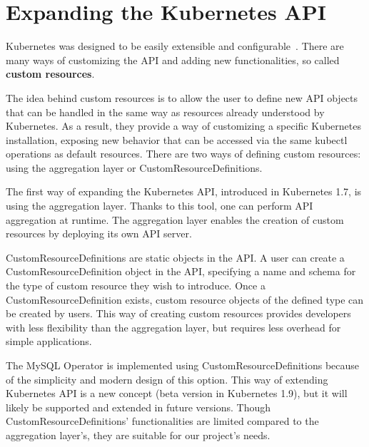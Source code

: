 \section{Expanding the Kubernetes API}
Kubernetes was designed to be easily extensible and configurable~\cite{extending-kubeapi}. There are
many ways of customizing the API and adding new functionalities, so called \textbf{custom resources}.

The idea behind custom resources is to allow the user to define new API objects that can be handled
in the same way as resources already understood by Kubernetes. As a result, they provide a way of
customizing a specific Kubernetes installation, exposing new behavior that can be accessed via the
same kubectl operations as default resources. There are two ways of defining custom resources: using
the aggregation layer or CustomResourceDefinitions.

The first way of expanding the Kubernetes API, introduced in Kubernetes 1.7, is using the
aggregation layer. Thanks to this tool, one can perform API aggregation at runtime. The aggregation
layer enables the creation of custom resources by deploying its own API server.

CustomResourceDefinitions are static objects in the API. A user can create a
CustomResourceDefinition object in the API, specifying a name and schema for the type of custom
resource they wish to introduce. Once a CustomResourceDefinition exists, custom resource objects of the defined type can
be created by users. This way of creating custom resources provides developers with less flexibility
than the aggregation layer, but requires less overhead for simple applications.

The MySQL Operator is implemented using CustomResourceDefinitions because of the simplicity and
modern design of this option. This way of extending Kubernetes API is a new concept (beta version in
Kubernetes 1.9), but it will likely be supported and extended in future versions. Though
CustomResourceDefinitions’ functionalities are limited compared to the aggregation layer’s, they
are suitable for our project’s needs.
